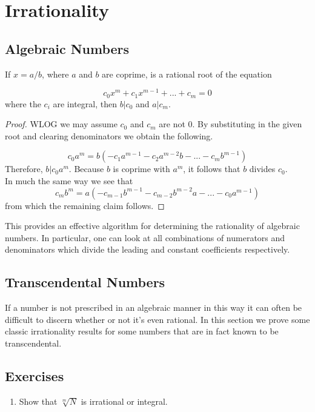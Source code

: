 \section{Irrationality}

\subsection{Algebraic Numbers}
\begin{theorem}\label{RRT}
    If $x = a/b$, where $a$ and $b$ are coprime, is a rational root of the equation

    \begin{equation*}
        c_0 x^m + c_1x^{m-1} + ... + c_m = 0
    \end{equation*}
    \noi
    where the $c_i$ are integral, then $b|c_0$ and $a|c_m$.
\end{theorem}

\begin{proof}
    WLOG we may assume $c_0$ and $c_m$ are not 0. By substituting in the given root and clearing 
    denominators we obtain the following.

    \begin{equation*}
        c_0 a^m = b(-c_1 a^{m-1} - c_2 a^{m-2}b - ... - c_m b^{m-1})
    \end{equation*}
    Therefore, $b|c_0 a^m$. Because $b$ is coprime with $a^m$, it follows that $b$ divides $c_0$. \\
    In much the same way we see that 
    \begin{equation*}
        c_m b^m = a(- c_{m-1}b^{m-1} - c_{m-2}b^{m-2}a - ... - c_0 a^{m-1})
    \end{equation*}
    from which the remaining claim follows.
\end{proof}
This provides an effective algorithm for determining the rationality of algebraic numbers. In particular, 
one can look at all combinations of numerators and denominators which divide the leading and constant 
coefficients respectively.
\subsection{Transcendental Numbers}
If a number is not prescribed in an algebraic manner in this way it can often be difficult to discern 
whether or not it's even rational. In this section we prove some classic irrationality results for 
some numbers that are in fact known to be transcendental.



\subsection{Exercises}
\begin{enumerate}
    \item Show that $\sqrt[m]{N}$ is irrational or integral. 
\end{enumerate} 




